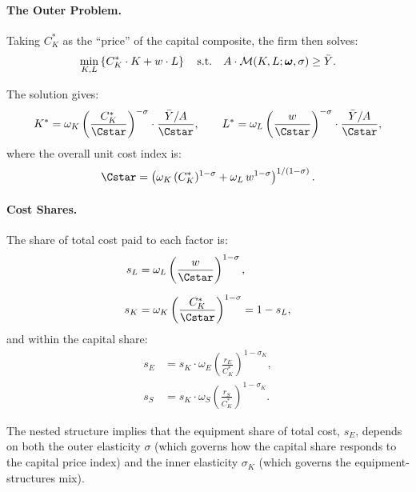 \paragraph{The Outer Problem.}
Taking $C_K^*$ as the ``price'' of the capital composite, the firm then solves:
\begin{equation}
\min_{K, L} \left\{ C_K^* \cdot K + w \cdot L \right\} \quad \text{s.t.} \quad A \cdot \mathcal{M}(K, L; \boldsymbol{\omega}, \sigma) \geq \bar{Y}.
\label{eq:outer-cost-min}
\end{equation}

The solution gives:
\begin{equation}
K^* = \omega_K \left( \frac{C_K^*}{\Cstar} \right)^{-\sigma} \cdot \frac{\bar{Y}/A}{\Cstar}, \qquad L^* = \omega_L \left( \frac{w}{\Cstar} \right)^{-\sigma} \cdot \frac{\bar{Y}/A}{\Cstar},
\label{eq:outer-demands}
\end{equation}
where the overall unit cost index is:
\begin{equation}
\Cstar = \left( \omega_K \, (C_K^*)^{1-\sigma} + \omega_L \, w^{1-\sigma} \right)^{1/(1-\sigma)}.
\label{eq:total-unit-cost}
\end{equation}

\paragraph{Cost Shares.}
The share of total cost paid to each factor is:
\begin{align}
s_L &= \omega_L \left( \frac{w}{\Cstar} \right)^{1-\sigma}, \label{eq:labor-share-nested} \\[6pt]
s_K &= \omega_K \left( \frac{C_K^*}{\Cstar} \right)^{1-\sigma} = 1 - s_L, \label{eq:capital-share-nested}
\end{align}
and within the capital share:
\begin{align}
s_E &= s_K \cdot \omega_E \left( \frac{r_E}{C_K^*} \right)^{1-\sigma_K}, \label{eq:equipment-share} \\[6pt]
s_S &= s_K \cdot \omega_S \left( \frac{r_S}{C_K^*} \right)^{1-\sigma_K}. \label{eq:structures-share}
\end{align}

The nested structure implies that the equipment share of total cost, $s_E$, depends on both the outer elasticity $\sigma$ (which governs how the capital share responds to the capital price index) and the inner elasticity $\sigma_K$ (which governs the equipment-structures mix).

